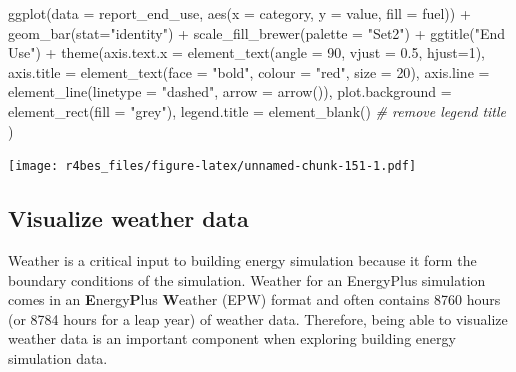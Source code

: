 \documentclass[
]{book}
\newenvironment{Shaded}{\begin{snugshade}}{\end{snugshade}}
\newcommand{\AttributeTok}[1]{\textcolor[rgb]{0.77,0.63,0.00}{#1}}
\newcommand{\CommentTok}[1]{\textcolor[rgb]{0.56,0.35,0.01}{\textit{#1}}}
\newcommand{\DecValTok}[1]{\textcolor[rgb]{0.00,0.00,0.81}{#1}}
\newcommand{\FloatTok}[1]{\textcolor[rgb]{0.00,0.00,0.81}{#1}}
\newcommand{\FunctionTok}[1]{\textcolor[rgb]{0.00,0.00,0.00}{#1}}
\newcommand{\NormalTok}[1]{#1}
\newcommand{\SpecialCharTok}[1]{\textcolor[rgb]{0.00,0.00,0.00}{#1}}
\newcommand{\StringTok}[1]{\textcolor[rgb]{0.31,0.60,0.02}{#1}}
\begin{document}
\begin{Shaded}
\begin{Highlighting}[]
\FunctionTok{ggplot}\NormalTok{(}\AttributeTok{data =}\NormalTok{ report\_end\_use, }\FunctionTok{aes}\NormalTok{(}\AttributeTok{x =}\NormalTok{ category, }\AttributeTok{y =}\NormalTok{ value, }\AttributeTok{fill =}\NormalTok{ fuel)) }\SpecialCharTok{+}
    \FunctionTok{geom\_bar}\NormalTok{(}\AttributeTok{stat=}\StringTok{"identity"}\NormalTok{) }\SpecialCharTok{+} 
    \FunctionTok{scale\_fill\_brewer}\NormalTok{(}\AttributeTok{palette =} \StringTok{"Set2"}\NormalTok{) }\SpecialCharTok{+}
    \FunctionTok{ggtitle}\NormalTok{(}\StringTok{"End Use"}\NormalTok{) }\SpecialCharTok{+}
    \FunctionTok{theme}\NormalTok{(}\AttributeTok{axis.text.x =} \FunctionTok{element\_text}\NormalTok{(}\AttributeTok{angle =} \DecValTok{90}\NormalTok{, }\AttributeTok{vjust =} \FloatTok{0.5}\NormalTok{, }\AttributeTok{hjust=}\DecValTok{1}\NormalTok{),}
          \AttributeTok{axis.title =} \FunctionTok{element\_text}\NormalTok{(}\AttributeTok{face =} \StringTok{"bold"}\NormalTok{, }
                                    \AttributeTok{colour =} \StringTok{"red"}\NormalTok{,}
                                    \AttributeTok{size =} \DecValTok{20}\NormalTok{),}
          \AttributeTok{axis.line =} \FunctionTok{element\_line}\NormalTok{(}\AttributeTok{linetype =} \StringTok{"dashed"}\NormalTok{, }
                                   \AttributeTok{arrow =} \FunctionTok{arrow}\NormalTok{()),}
          \AttributeTok{plot.background =} \FunctionTok{element\_rect}\NormalTok{(}\AttributeTok{fill =} \StringTok{"grey"}\NormalTok{),}
          \AttributeTok{legend.title =} \FunctionTok{element\_blank}\NormalTok{() }\CommentTok{\# remove legend title}
\NormalTok{          )}
\end{Highlighting}
\end{Shaded}

\texttt{[image: r4bes\_files/figure-latex/unnamed-chunk-151-1.pdf]}

\hypertarget{visualize-weather-data}{%
\subsection{Visualize weather data}\label{visualize-weather-data}}

Weather is a critical input to building energy simulation because it form the boundary conditions of the simulation. Weather for an EnergyPlus simulation comes in an \textbf{E}nergy\textbf{P}lus \textbf{W}eather (EPW) format and often contains 8760 hours (or 8784 hours for a leap year) of weather data. Therefore, being able to visualize weather data is an important component when exploring building energy simulation data.
\end{document}
